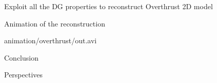 \begin{frame}{Exploit all the DG properties to reconstruct Overthrust 2D model}
\begin{overprint}

  \vspace{-1.0cm}
  \begin{block}{Animation of the reconstruction}
      \begin{center}
            {animation/overthrust/out.avi}
      \end{center}
    \end{block}

\end{overprint}

\end{frame}


\begin{frame}{Conclusion}
\end{frame}

\begin{frame}{Perspectives}
  \end{frame}

